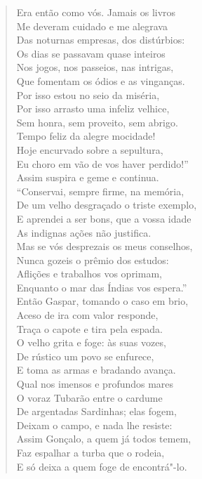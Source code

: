 \begin{verse}
Era então como vós. Jamais os livros\\
Me deveram cuidado e me alegrava\\
Das noturnas empresas, dos distúrbios:\\
Os dias se passavam quase inteiros\\
Nos jogos, nos passeios, nas intrigas,\\
Que fomentam os ódios e as vinganças.\\
Por isso estou no seio da miséria,\\
Por isso arrasto uma infeliz velhice,\\
Sem honra, sem proveito, sem abrigo.\\
Tempo feliz da alegre mocidade!\\
Hoje encurvado sobre a sepultura,\\
Eu choro em vão de vos haver perdido!''\\
Assim suspira e geme e continua.\\
``Conservai, sempre firme, na memória,\\
De um velho desgraçado o triste exemplo,\\
E aprendei a ser bons, que a vossa idade\\
As indignas ações não justifica.\\
Mas se vós desprezais os meus conselhos,\\
Nunca gozeis o prêmio dos estudos:\\
Aflições e trabalhos vos oprimam,\\
Enquanto o mar das Índias vos espera.'' \\[10pt] %


Então Gaspar, tomando o caso em brio,\\
Aceso de ira com valor responde,\\
Traça o capote e tira pela espada.\\
O velho grita e foge: às suas vozes,\\
De rústico um povo se enfurece,\\
E toma as armas e bradando avança.\\
Qual nos imensos e profundos mares\\
O voraz Tubarão entre o cardume\\
De argentadas Sardinhas; elas fogem,\\
Deixam o campo, e nada lhe resiste:\\
Assim Gonçalo, a quem já todos temem,\\
Faz espalhar a turba que o rodeia,\\
E só deixa a quem foge de encontrá"-lo. \\[10pt]



\end{verse}
